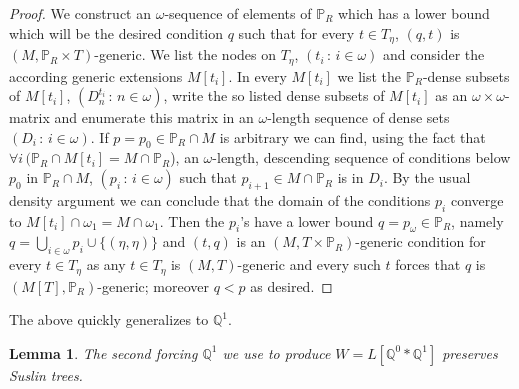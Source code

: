 \documentclass[a4paper,12pt]{article}
\newtheorem{lemma}[theorem]{Lemma}
\newcommand{\forceP}{\mathbb{P}}
\newcommand{\forceQ}{\mathbb{Q}}
\begin{document}
\begin{proof}
 We construct an $\omega$-sequence of elements of $\forceP_R$ which has a lower bound
 which will be the desired condition $q$ such that for every $t \in T_{\eta}$, $(q,t)$ is $(M, \forceP_R \times T)$-generic. 
 We list the nodes on $T_{\eta}$, $(t_i \, : \, i \in \omega)$ and
 consider the according generic extensions $M[t_i]$.
 In every $M[t_i]$ we list the $\forceP_R$-dense subsets of $M[t_i]$,
 $(D^{t_i}_n \, : \, n \in \omega)$, write 
 the so listed dense subsets of $M[t_i]$ as an $\omega \times \omega$-matrix and enumerate
 this matrix in an $\omega$-length sequence of dense sets $(D_i \, : \, i \in \omega)$.
 If $p=p_0 \in \forceP_R \cap M$ is arbitrary we can find, using the fact that $\forall i \, (\forceP_R \cap M[t_i] = M \cap \forceP_R$), an $\omega$-length, descending
 sequence of conditions below $p_0$ in $\forceP_R \cap M$, $(p_i \, : \, i \in \omega)$
 such that $p_{i+1} \in M \cap \forceP_R$ is in $D_i$.
 By the usual density argument we can conclude that the domain of the conditions $p_i$ converge to $M[t_i] \cap \omega_1=M \cap \omega_1$.
 Then the $p_i$'s have a lower bound $q=p_{\omega} \in \forceP_R$, namely $q= \bigcup_{i \in \omega} p_i \cup \{(\eta, \eta)\}$  and $(t, q)$ is an
 $(M, T \times \forceP_R)$-generic condition for every $t \in T_{\eta}$ as any $t \in T_{\eta}$ is $(M,T)$-generic
 and every such $t$ forces that $q$ is $(M[T], \forceP_R)$-generic; moreover $q < p$ as 
 desired.
 \end{proof}
The above quickly generalizes to $\forceQ^1$.
\begin{lemma}
The second forcing $\forceQ^1$ we use to produce $W=L[\forceQ^0 \ast \forceQ^1]$ preserves Suslin trees.
\end{lemma}
\end{document}
